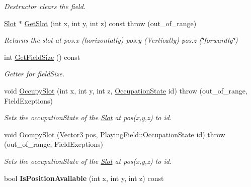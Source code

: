 \begin{DoxyCompactItemize}
\begin{DoxyCompactList}\small\item\em Destructor clears the field. \end{DoxyCompactList}\item 
\hyperlink{structPlayingField_1_1Slot}{Slot} $\ast$ \hyperlink{classPlayingField_a01b5105b49ec72e094411d216df27ffa}{Get\-Slot} (int x, int y, int z) const   throw (out\-\_\-of\-\_\-range)
\begin{DoxyCompactList}\small\item\em Returns the slot at pos.\-x (horizontally) pos.\-y (Vertically) pos.\-z (\char`\"{}forwardly\char`\"{}) \end{DoxyCompactList}\item 
int \hyperlink{classPlayingField_abfbecf0f8ba91c9c1167da359e7463dc}{Get\-Field\-Size} () const 
\begin{DoxyCompactList}\small\item\em Getter for field\-Size. \end{DoxyCompactList}\item 
void \hyperlink{classPlayingField_a166ff0aaa90a41ce748efd9165a9d578}{Occupy\-Slot} (int x, int y, int z, \hyperlink{classPlayingField_ac6df152a3f820aa04a00ab4df4a9d265}{Occupation\-State} id)  throw (out\-\_\-of\-\_\-range, Field\-Exeptions)
\begin{DoxyCompactList}\small\item\em Sets the occupation\-State of the \hyperlink{structPlayingField_1_1Slot}{Slot} at pos(x,y,z) to id. \end{DoxyCompactList}\item 
void \hyperlink{classPlayingField_a6165557999a6cec6c1c1b71b88c2f82e}{Occupy\-Slot} (\hyperlink{structVector3}{Vector3} pos, \hyperlink{classPlayingField_ac6df152a3f820aa04a00ab4df4a9d265}{Playing\-Field\-::\-Occupation\-State} id)  throw (out\-\_\-of\-\_\-range, Field\-Exeptions)
\begin{DoxyCompactList}\small\item\em Sets the occupation\-State of the \hyperlink{structPlayingField_1_1Slot}{Slot} at pos(x,y,z) to id. \end{DoxyCompactList}\item 
\hypertarget{classPlayingField_af25e735d1d9f1c561fdf951507b2c1de}{bool {\bfseries Is\-Position\-Available} (int x, int y, int z) const }\label{classPlayingField_af25e735d1d9f1c561fdf951507b2c1de}

\end{DoxyCompactItemize}


